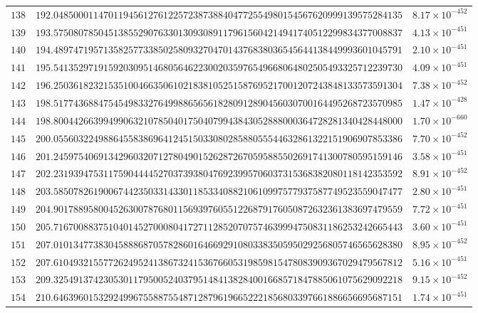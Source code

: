 \documentclass[12pt,reqno]{amsart}
\theoremstyle{remark}
\begin{document}
\begin{longtable}{clc}
$138$ & $192.0485000114701194561276122572387388404772554980154567620999139575284135$ & $8.17\times 10^{-452}$ \\
$139$ & $193.5750807850451385529076330130930891179615604214941740512299834377008837$ & $4.13\times 10^{-451}$ \\
$140$ & $194.4897471957135825773385025809327047014376838036545644138449993601045791$ & $2.10\times 10^{-451}$ \\
$141$ & $195.5413529719159203095146805646223002035976549668064802505493325712239730$ & $4.09\times 10^{-451}$ \\
$142$ & $196.2503618232153510046635061021838105251587695217001207243848133573591304$ & $7.38\times 10^{-452}$ \\
$143$ & $198.5177436884754549833276499886565618280912890456030700164495268723570985$ & $1.47\times 10^{-428}$ \\
$144$ & $198.8004426639949906321078504017504079943843052888000364728281340428448000$ & $1.70\times 10^{-660}$ \\
$145$ & $200.0556032249886455838696412451503308028588055544632861322151906907853386$ & $7.70\times 10^{-452}$ \\
$146$ & $201.2459754069134296032071278049015262872670595885502691741300780595159146$ & $3.58\times 10^{-451}$ \\
$147$ & $202.2319394753117590444452703739380476923995706037315368382080118142353592$ & $8.91\times 10^{-452}$ \\
$148$ & $203.5850782619006744235033143301185334088210610997577937587749523559047477$ & $2.80\times 10^{-451}$ \\
$149$ & $204.9017889580045263007876801156939760551226879176050872632361383697479559$ & $7.72\times 10^{-451}$ \\
$150$ & $205.7167008837510401452700080417271128520707574639994750831186253242665443$ & $3.60\times 10^{-451}$ \\
$151$ & $207.0101347738304588868705782860164669291080338350595029256805746565628380$ & $8.95\times 10^{-452}$ \\
$152$ & $207.6104932155772624952413867324153676605319859815478083909367029479567812$ & $5.16\times 10^{-451}$ \\
$153$ & $209.3254913742305301179500524037951484138284001668571847885061075629092218$ & $9.15\times 10^{-452}$ \\
$154$ & $210.6463960153292499675588755487128796196652221856803397661886656695687151$ & $1.74\times 10^{-451}$ \\

\end{longtable}
\end{document}
